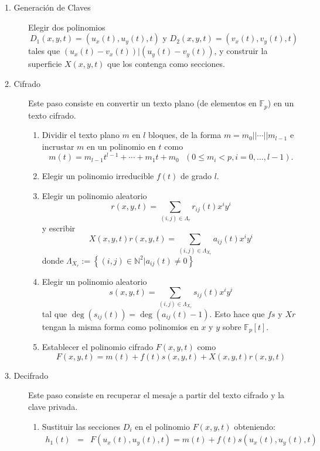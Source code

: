 \documentclass[11pt]{article}
\newcommand{\N}{\mathbb{N}}
\newcommand{\Fp}{\mathbb{F}_p}
\newcommand{\izq}{\left\{ }
\newcommand{\der}{\right\} }
\numberwithin{equation}{section} %
\numberwithin{figure}{section} %
\numberwithin{table}{section} %
\begin{document}
				\begin{description}%
					\item[1. Generaci\'on de Claves] Elegir dos polinomios%
						$$
							D_1(x,y,t)=(u_x(t),u_y(t),t)\text{ y } D_2(x,y,t)=(v_x(t),v_y(t),t)
						$$
						tales que $(u_x(t)-v_x(t))|(u_y(t)-v_y(t))$, y construir la superficie $X(x,y,t)$ que los contenga como secciones.
					\item[2. Cifrado] Este paso consiste en convertir un texto plano (de elementos en $\Fp$) en un texto cifrado.%
					\begin{enumerate}%
						\item Dividir el texto plano $m$ en $l$ bloques, de la forma $m=m_0||\cdots||m_{l-1}$ e incrustar $m$ en un polinomio en $t$ como%
							$$
								m(t)=m_{l-1}t^{l-1}+\cdots+m_1t+m_0 \text{ }(0\leq m_i<p, i=0,\ldots,l-1).
							$$
						\item Elegir un polinomio irreducible $f(t)$ de grado $l$.%
						\item Elegir un polinomio aleatorio%
							$$
								r(x,y,t)=\sum_{(i,j)\in\Lambda_r}r_{ij}(t)x^iy^i
							$$
							y escribir
							$$
								X(x,y,t)r(x,y,t)=\sum_{(i,j)\in\Lambda_{X_r}}a_{ij}(t)x^iy^i
							$$
							donde $\Lambda_{X_r}:=\izq (i,j)\in\N^2|a_{ij}(t)\neq 0\der$
						\item Elegir un polinomio aleatorio%
							$$
								s(x,y,t)=\sum_{(i,j)\in\Lambda_{X_r}}s_{ij}(t)x^iy^i
							$$
							tal que $\deg(s_{ij}(t))=\deg(a_{ij}(t)-1)$. Esto hace que $fs$ y $Xr$ tengan la misma forma como polinomios en $x$ y $y$ sobre $\Fp[t]$.
						\item Establecer el polinomio cifrado $F(x,y,t)$ como%
							\begin{equation}
								\label{texcif}
								F(x,y,t)=m(t)+f(t)s(x,y,t)+X(x,y,t)r(x,y,t)
							\end{equation}
					\end{enumerate}%
				\item[3. Decifrado] Este paso consiste en recuperar el mesaje a partir del texto cifrado y la clave privada.%
				\begin{enumerate}%
					\item Sustituir las secciones $D_i$ en el polinomio $F(x,y,t)$ obteniendo:%
					\begin{eqnarray}
						h_1(t)&=&F(u_x(t),u_y(t),t)=m(t)+f(t)s(u_x(t),u_y(t),t)\nonumber\\

\end{eqnarray}
\end{enumerate}
\end{description}
\end{document}
